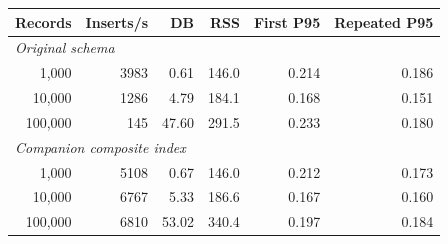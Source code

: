 \begin{tabular}{@{}rrrrrr@{}}\toprule Records & Inserts/s & DB & RSS & First P95 & Repeated P95\\\midrule
\multicolumn{6}{l}{\textit{Original schema}}\\
1,000 & 3983 & 0.61 & 146.0 & 0.214 & 0.186 \\
10,000 & 1286 & 4.79 & 184.1 & 0.168 & 0.151 \\
100,000 & 145 & 47.60 & 291.5 & 0.233 & 0.180 \\
\multicolumn{6}{l}{\textit{Companion composite index}}\\
1,000 & 5108 & 0.67 & 146.0 & 0.212 & 0.173 \\
10,000 & 6767 & 5.33 & 186.6 & 0.167 & 0.160 \\
100,000 & 6810 & 53.02 & 340.4 & 0.197 & 0.184 \\
\bottomrule\end{tabular}
